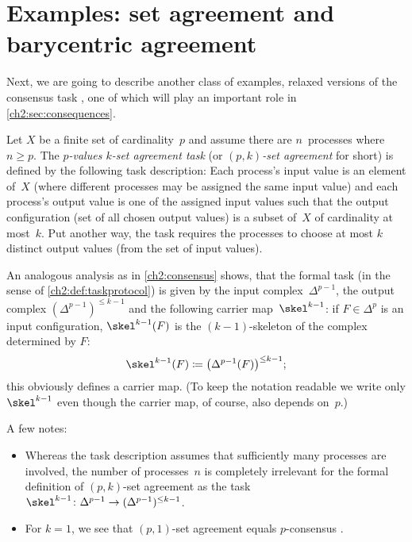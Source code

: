 \section{Examples: set agreement and barycentric agreement}
Next, we are going to describe another class of examples, relaxed versions of
the consensus task , one of which will play an important
role in \cref{ch2:sec:consequences}.

\begin{thExample}
    \label{ch2:setagreement}
    Let $X$ be a finite set of cardinality~$p$ and assume there are
    $n$~processes where $n\geq p$.  The \emph{$p$-values $k$-set
    agreement task} (or \emph{$(p,k)$-set agreement} for short) is
    defined by the following task description:
    Each process's input value is an element of~$X$ (where different
    processes may be assigned the same input value) and each process's
    output value is one of the assigned input values such that
    the output configuration (set of all chosen output values)
    is a subset of~$X$ of cardinality at most~$k$. Put another way,
    the task requires the processes to choose at most $k$ distinct
    output values (from the set of input values).
    
    An analogous analysis as in \cref{ch2:consensus} shows, that
    the formal task (in the sense of \cref{ch2:def:taskprotocol})
    is given by the input complex~$\Delta^{p-1}$, the output complex
    $(\Delta^{p-1})^{\leq k-1}$ and the following carrier map~$\skel^{k-1}$:
    if $F\in\Delta^p$ is an input configuration, $\skel^{k-1}(F)$ is the
    $(k{-}1)$-skeleton of the complex determined by $F$:
    \[ \skel^{k-1}(F) \defeq \bigl(\Delta^{p-1}(F)\bigr)^{\leq k-1}
    ; \]
    this obviously defines a carrier map. (To keep the notation
    readable we write only $\skel^{k-1}$ even though the carrier map,
    of course, also depends on~$p$.)
    
    A few notes:
    \begin{itemize}
        \item
            Whereas the task description assumes that sufficiently many
            processes are involved, the number of processes~$n$ is completely
            irrelevant for the formal definition of $(p,k)$-set agreement
            as the task
            $\skel^{k-1}\colon\Delta^{p-1}\to(\Delta^{p-1})^{\leq k-1}$.
            
        \item
            For $k=1$, we see that $(p,1)$-set agreement equals $p$-consensus
            .
            

\end{itemize}
\end{thExample}

